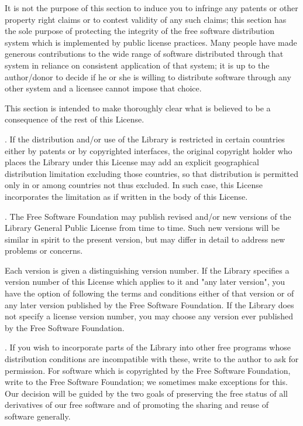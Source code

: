 It is not the purpose of this section to induce you to infringe any patents or other property right claims or to contest validity of any such claims; this section has the sole purpose of protecting the integrity of the free software distribution system which is implemented by public license practices. Many people have made generous contributions to the wide range of software distributed through that system in reliance on consistent application of that system; it is up to the author/donor to decide if he or she is willing to distribute software through any other system and a licensee cannot impose that choice. 

This section is intended to make thoroughly clear what is believed to be a consequence of the rest of this License. 

. If the distribution and/or use of the Library is restricted in certain countries either by patents or by copyrighted interfaces, the original copyright holder who places the Library under this License may add an explicit geographical distribution limitation excluding those countries, so that distribution is permitted only in or among countries not thus excluded. In such case, this License incorporates the limitation as if written in the body of this License. 

. The Free Software Foundation may publish revised and/or new versions of the Library General Public License from time to time. Such new versions will be similar in spirit to the present version, but may differ in detail to address new problems or concerns. 

Each version is given a distinguishing version number. If the Library specifies a version number of this License which applies to it and "any later version", you have the option of following the terms and conditions either of that version or of any later version published by the Free Software Foundation. If the Library does not specify a license version number, you may choose any version ever published by the Free Software Foundation. 

. If you wish to incorporate parts of the Library into other free programs whose distribution conditions are incompatible with these, write to the author to ask for permission. For software which is copyrighted by the Free Software Foundation, write to the Free Software Foundation; we sometimes make exceptions for this. Our decision will be guided by the two goals of preserving the free status of all derivatives of our free software and of promoting the sharing and reuse of software generally. 


